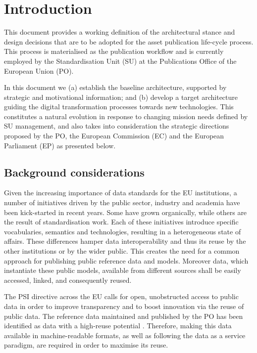 \chapter{Introduction}
\label{sec:introduction}
	
	This document provides a working definition of the architectural stance and design decisions that are to be adopted for the asset publication life-cycle process. This process is materialised as the publication workflow and is currently employed by the Standardisation Unit (SU) at the Publications Office of the European Union (PO).
	
	In this document we (a) establish the baseline architecture, supported by  strategic and motivational information; and (b) develop a target architecture guiding the digital transformation processes towards new technologies. This constitutes a natural evolution in response to changing mission needs defined by SU management, and also takes into consideration the strategic directions proposed by the PO, the European Commission (EC) and the European Parliament (EP) as presented below.
	
	\section{Background considerations}
	
	Given the increasing importance of data standards for the EU institutions, a number of initiatives driven by the public sector, industry and academia have been kick-started in recent years. Some have grown organically, while others are the result of standardisation work. Each of these initiatives introduce specific vocabularies, semantics and technologies, resulting in a heterogeneous state of affairs. These differences hamper data interoperability and thus its reuse by the other institutions or by the wider public. This creates the need for a common approach for publishing public reference data and models. Moreover data, which instantiate these public models, available from different sources shall be easily accessed, linked, and consequently reused.
	
	
	The PSI directive \cite{directive-2019/1024} across the EU calls for open, unobstructed access to public data in order to improve transparency and to boost innovation via the reuse of public data. The reference data maintained and published by the PO has been identified as data with a high-reuse potential \cite{d-high-value-assets}. Therefore, making this data available in machine-readable formats, as well as following the data as a service paradigm, are required in order to maximise its reuse.
	
